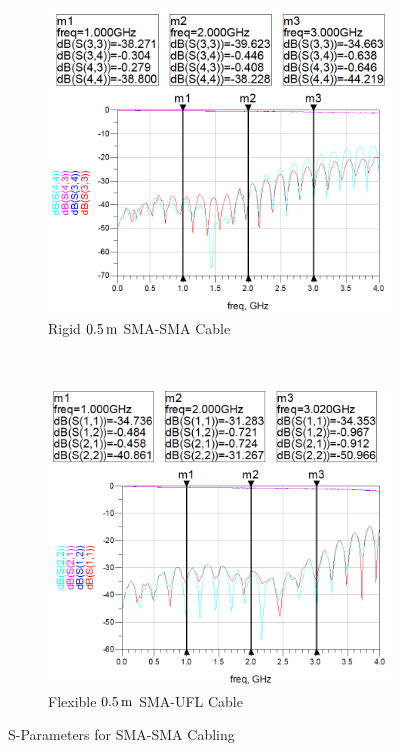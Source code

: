 \documentclass[12pt,openany,a4paper]{book}
\newcommand{\m}		{\ensuremath{\rm\,m}}
\begin{document}
\begin{figure}[H]
    \centering
    \begin{subfigure}[t]{0.5\textwidth}
        \centering
        \includegraphics[width=1\textwidth]{sma-rigid.png}
        \caption{Rigid $0.5\m$ SMA-SMA Cable}
    \end{subfigure}%
    ~ 
    \begin{subfigure}[t]{0.5\textwidth}
        \centering
        \includegraphics[width=1\textwidth]{sma-flex.png}
        \caption{Flexible $0.5\m$ SMA-UFL Cable}
        \label{fig:sma-flex-cable}
    \end{subfigure}
    \caption{S-Parameters for SMA-SMA Cabling}
\end{figure}
\end{document}
